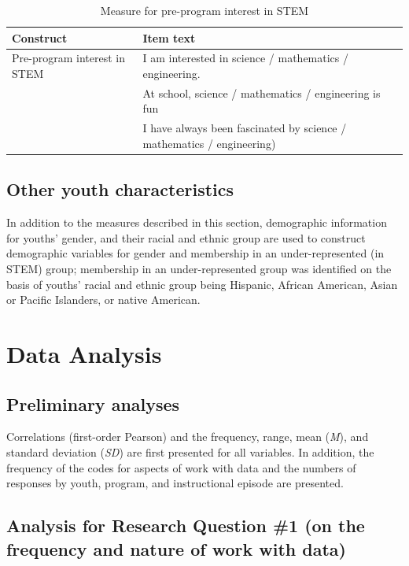 \documentclass[]{msu-thesis}
\theoremstyle{definition}
\theoremstyle{definition}
\theoremstyle{definition}
\theoremstyle{remark}
\begin{document}
\begin{table}

\caption{\label{tab:unnamed-chunk-5}Measure for pre-program interest in STEM}
\centering
\begin{tabular}[t]{l>{\raggedright\arraybackslash}p{20em}}
\toprule
Construct & Item text\\
\midrule
Pre-program interest in STEM & I am interested in science / mathematics / engineering.\\
 & At school, science / mathematics / engineering is fun\\
 & I have always been fascinated by science / mathematics / engineering)\\
\bottomrule
\end{tabular}
\end{table}

\subsection{Other youth
characteristics}\label{other-youth-characteristics}

In addition to the measures described in this section, demographic
information for youths' gender, and their racial and ethnic group are
used to construct demographic variables for gender and membership in an
under-represented (in STEM) group; membership in an under-represented
group was identified on the basis of youths' racial and ethnic group
being Hispanic, African American, Asian or Pacific Islanders, or native
American.

\section{Data Analysis}\label{data-analysis}

\subsection{Preliminary analyses}\label{preliminary-analyses}

Correlations (first-order Pearson) and the frequency, range, mean
(\emph{M}), and standard deviation (\emph{SD}) are first presented for
all variables. In addition, the frequency of the codes for aspects of
work with data and the numbers of responses by youth, program, and
instructional episode are presented.

\subsection{Analysis for Research Question \#1 (on the frequency and
nature of work with
data)}\label{analysis-for-research-question-1-on-the-frequency-and-nature-of-work-with-data}
\end{document}

